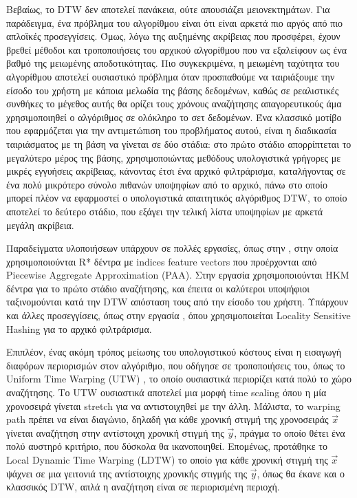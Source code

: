 Βεβαίως, το DTW δεν αποτελεί πανάκεια, ούτε απουσιάζει μειονεκτημάτων.
Για παράδειγμα, ένα πρόβλημα του αλγορίθμου είναι ότι είναι αρκετά πιο αργός
από πιο απλοϊκές προσεγγίσεις.
Όμως, λόγω της αυξημένης ακρίβειας που προσφέρει, έχουν βρεθεί μέθοδοι και
τροποποιήσεις του αρχικού αλγορίθμου που να εξαλείφουν ως ένα βαθμό της μειωμένης
αποδοτικότητας.
Πιο συγκεκριμένα, η μειωμένη ταχύτητα του αλγορίθμου αποτελεί ουσιαστικό
πρόβλημα όταν προσπαθούμε να ταιριάξουμε την είσοδο του χρήστη με κάποια
μελωδία της βάσης δεδομένων, καθώς σε ρεαλιστικές συνθήκες το μέγεθος αυτής
θα ορίζει τους χρόνους αναζήτησης απαγορευτικούς άμα χρησιμοποιηθεί ο αλγόριθμος
σε ολόκληρο το σετ δεδομένων.
Ένα κλασσικό μοτίβο που εφαρμόζεται για την αντιμετώπιση του προβλήματος αυτού,
είναι η διαδικασία ταιριάσματος με τη βάση να γίνεται σε δύο στάδια: στο πρώτο
στάδιο απορρίπτεται το μεγαλύτερο μέρος της βάσης, χρησιμοποιώντας μεθόδους
υπολογιστικά γρήγορες με μικρές εγγυήσεις ακρίβειας, κάνοντας έτσι ένα αρχικό
φιλτράρισμα, καταλήγοντας σε ένα πολύ μικρότερο σύνολο πιθανών υποψηφίων από
το αρχικό, πάνω στο οποίο μπορεί πλέον να εφαρμοστεί ο υπολογιστικά απαιτητικός
αλγόριθμος DTW, το οποίο αποτελεί το δεύτερο στάδιο, που εξάγει την τελική
λίστα υποψηφίων με αρκετά μεγάλη ακρίβεια.

Παραδείγματα υλοποιήσεων υπάρχουν σε πολλές εργασίες, όπως στην
\cite{Zhu:2003:WIE:872757.872780}, στην οποία χρησιμοποιούνται R* δέντρα με
indices feature vectors που προέρχονται από Piecewise Aggregate Approximation
(PAA). Στην εργασία \cite{hou2014mirex2014} χρησιμοποιούνται HKM δέντρα για το
πρώτο στάδιο αναζήτησης, και έπειτα οι καλύτεροι υποψήφιοι ταξινομούνται κατά
την DTW απόσταση τους από την είσοδο του χρήστη. Υπάρχουν και άλλες
προσεγγίσεις, όπως στην εργασία \cite{ryynanen2008query}, όπου χρησιμοποιείται
Locality Sensitive Hashing για το αρχικό φιλτράρισμα.

Επιπλέον, ένας ακόμη τρόπος μείωσης του υπολογιστικού κόστους είναι η εισαγωγή
διαφόρων περιορισμών στον αλγόριθμο, που οδήγησε σε τροποποιήσεις του, όπως το
Uniform Time Warping (UTW) \cite{Zhu:2003:WIE:872757.872780}, το οποίο
ουσιαστικά περιορίζει κατά πολύ το χώρο αναζήτησης.
Το UTW ουσιαστικά αποτελεί μια μορφή time scaling όπου η μία χρονοσειρά γίνεται
stretch για να αντιστοιχηθεί με την άλλη.
Μάλιστα, το warping path πρέπει να είναι διαγώνιο, δηλαδή για κάθε χρονική
στιγμή της χρονοσειράς $\vec x$ γίνεται αναζήτηση στην αντίστοιχη χρονική στιγμή
της $\vec y$, πράγμα το οποίο θέτει ένα πολύ αυστηρό κριτήριο, που δύσκολα θα
ικανοποιηθεί.
Επομένως, προτάθηκε το Local Dynamic Time Warping (LDTW)
\cite{Zhu:2003:WIE:872757.872780} το οποίο για κάθε χρονική στιγμή της $\vec x$
ψάχνει σε μια γειτονιά της αντίστοιχης χρονικής στιγμής της $\vec y$, όπως θα
έκανε και ο κλασσικός DTW, απλά η αναζήτηση είναι σε περιορισμένη περιοχή.

